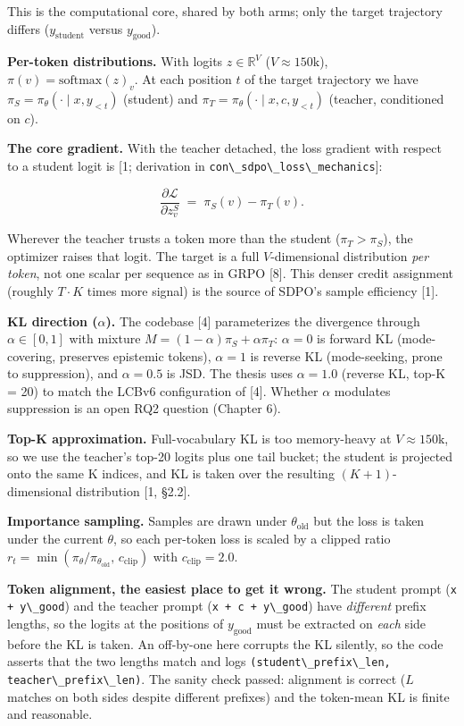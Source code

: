 This is the computational core, shared by both arms; only the target trajectory differs (\(y_{\text{student}}\) versus \(y_{\text{good}}\)).

\textbf{Per-token distributions.} With logits \(z \in \mathbb{R}^V\) (\(V \approx 150\text{k}\)), \(\pi(v) = \mathrm{softmax}(z)_v\). At each position \(t\) of the target trajectory we have \(\pi_S = \pi_\theta(\cdot\mid x, y_{<t})\) (student) and \(\pi_T = \pi_\theta(\cdot \mid x, c, y_{<t})\) (teacher, conditioned on \(c\)).

\textbf{The core gradient.} With the teacher detached, the loss gradient with respect to a student logit is {[}1; derivation in \passthrough{\lstinline!con\_sdpo\_loss\_mechanics!}{]}:

\[
\frac{\partial \mathcal{L}}{\partial z_v^{S}} \;=\; \pi_S(v) - \pi_T(v).
\]

Wherever the teacher trusts a token more than the student (\(\pi_T > \pi_S\)), the optimizer raises that logit. The target is a full \(V\)-dimensional distribution \emph{per token}, not one scalar per sequence as in GRPO {[}8{]}. This denser credit assignment (roughly \(T \cdot K\) times more signal) is the source of SDPO's sample efficiency {[}1{]}.

\textbf{KL direction (\(\alpha\)).} The codebase {[}4{]} parameterizes the divergence through \(\alpha \in [0,1]\) with mixture \(M = (1-\alpha)\pi_S + \alpha\pi_T\): \(\alpha = 0\) is forward KL (mode-covering, preserves epistemic tokens), \(\alpha = 1\) is reverse KL (mode-seeking, prone to suppression), and \(\alpha = 0.5\) is JSD. The thesis uses \(\alpha = 1.0\) (reverse KL, top-K = 20) to match the LCBv6 configuration of {[}4{]}. Whether \(\alpha\) modulates suppression is an open RQ2 question (Chapter 6).

\textbf{Top-K approximation.} Full-vocabulary KL is too memory-heavy at \(V \approx 150\text{k}\), so we use the teacher's top-20 logits plus one tail bucket; the student is projected onto the same K indices, and KL is taken over the resulting \((K{+}1)\)-dimensional distribution {[}1, §2.2{]}.

\textbf{Importance sampling.} Samples are drawn under \(\theta_{\text{old}}\) but the loss is taken under the current \(\theta\), so each per-token loss is scaled by a clipped ratio \(r_t = \min(\pi_\theta/\pi_{\theta_\text{old}},\, c_{\text{clip}})\) with \(c_{\text{clip}} = 2.0\).

\textbf{Token alignment, the easiest place to get it wrong.} The student prompt (\passthrough{\lstinline!x + y\_good!}) and the teacher prompt (\passthrough{\lstinline!x + c + y\_good!}) have \emph{different} prefix lengths, so the logits at the positions of \(y_{\text{good}}\) must be extracted on \emph{each} side before the KL is taken. An off-by-one here corrupts the KL silently, so the code asserts that the two lengths match and logs \passthrough{\lstinline!(student\_prefix\_len, teacher\_prefix\_len)!}. The sanity check passed: alignment is correct (\(L\) matches on both sides despite different prefixes) and the token-mean KL is finite and reasonable.

